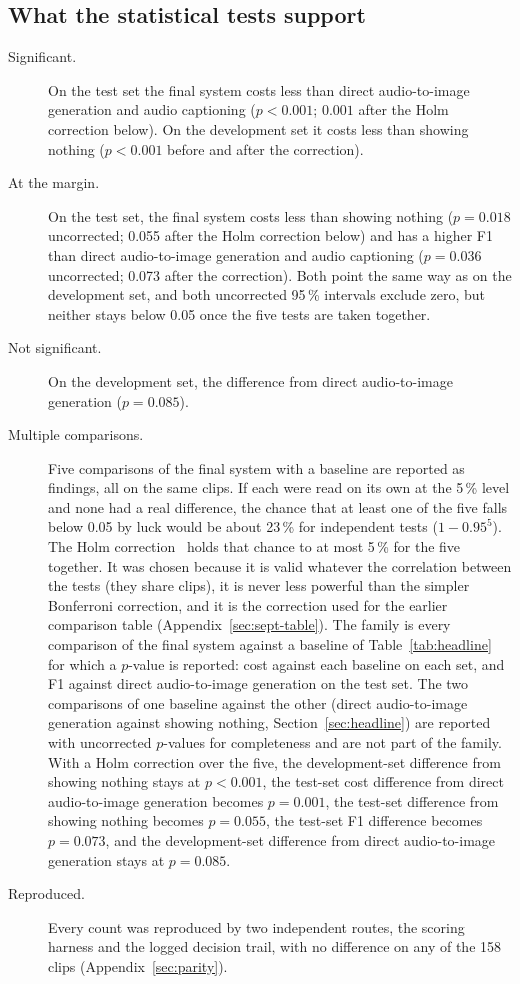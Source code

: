 \subsection{What the statistical tests support}\label{sec:support}
\begin{description}
  \item[Significant.] On the test set the final system costs less than direct audio-to-image generation and audio
        captioning ($p < 0.001$; $0.001$ after the Holm correction below). On the development set it costs less than
        showing nothing ($p < 0.001$ before and after the correction).
  \item[At the margin.] On the test set, the final system costs less than showing nothing ($p = 0.018$ uncorrected;
        0.055 after the Holm correction below) and has a higher F1 than direct audio-to-image generation and audio
        captioning ($p = 0.036$ uncorrected; 0.073 after the correction). Both point the same way as on the development
        set, and both uncorrected 95\,\% intervals exclude zero, but neither stays below 0.05 once the five tests are
        taken together.
  \item[Not significant.] On the development set, the difference from direct audio-to-image generation ($p = 0.085$).
  \item[Multiple comparisons.] Five comparisons of the final system with a baseline are reported as findings, all on
        the same clips. If each were read on its own at the 5\,\% level and none had a real difference, the chance
        that at least one of the five falls below 0.05 by luck would be about 23\,\% for independent tests
        ($1 - 0.95^5$). The Holm correction~\cite{holm1979} holds that chance to at most 5\,\% for the five together.
        It was chosen because it is valid whatever the correlation between the tests (they share clips), it is never less powerful than the simpler
        Bonferroni correction, and it is the correction used for the earlier comparison table
        (Appendix~\ref{sec:sept-table}). The family is every comparison of the final system against a baseline of Table~\ref{tab:headline} for which a
        $p$-value is reported: cost against each baseline on each set, and F1 against direct audio-to-image generation
        on the test set. The two comparisons of one baseline against the other (direct audio-to-image generation against showing nothing, Section~\ref{sec:headline}) are reported with uncorrected $p$-values for completeness and are not part of the family. With a Holm correction over the five, the
        development-set difference from showing nothing stays at $p < 0.001$, the test-set cost difference from direct
        audio-to-image generation becomes $p = 0.001$, the test-set difference from showing nothing becomes
        $p = 0.055$, the test-set F1 difference becomes $p = 0.073$, and the development-set difference from direct
        audio-to-image generation stays at $p = 0.085$.
  \item[Reproduced.] Every count was reproduced by two independent routes, the scoring harness and the logged
        decision trail, with no difference on any of the 158 clips (Appendix~\ref{sec:parity}).
\end{description}

